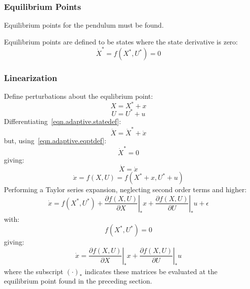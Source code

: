 \subsubsection{Equilibrium Points}

Equilibrium points for the pendulum must be found.

Equilibrium points are defined to be states where the state derivative is zero:
\begin{equation}\label{eqn.adaptive.eqptdef}
  \dot{X}^{*}=f(X^{*},U^{*})=0
\end{equation}

\subsubsection{Linearization}

Define perturbations about the equlibrium point:
\begin{equation}\label{eqn.adaptive.statedef}
  X=X^{*}+x
\end{equation}
\begin{equation}\label{inputdef}
  U=U^{*}+u
\end{equation}
Differentiating~\eqref{eqn.adaptive.statedef}:
\begin{equation*}
  \dot{X}=\dot{X}^{*}+\dot{x}
\end{equation*}
but, using~\eqref{eqn.adaptive.eqptdef}:
\begin{equation*}
  \dot{X}^{*}=0
\end{equation*}
giving:
\begin{equation*}
  \dot{X}=\dot{x}
\end{equation*}
\begin{equation*}
  \dot{x}=f(X,U)=f(X^{*}+x,U^{*}+u)
\end{equation*}
Performing a Taylor series expansion, neglecting second order terms and higher:
\begin{equation*}
  \dot{x}=f(X^{*},U^{*})+\left.\frac{\partial{}f(X,U)}{\partial{}X}\right|_{*}^{}x+\left.\frac{\partial{}f(X,U)}{\partial{}U}\right|_{*}^{}u+\epsilon
\end{equation*}
with:
\begin{equation*}
  f(X^{*},U^{*})=0
\end{equation*}
giving:
\begin{equation*}
  \dot{x}=\left.\frac{\partial{}f(X,U)}{\partial{}X}\right|_{*}^{}x+\left.\frac{\partial{}f(X,U)}{\partial{}U}\right|_{*}^{}u
\end{equation*}
where the subscript $(\cdot)_{*}$ indicates these matrices be evaluated at the equilibrium point found in the preceding section.

